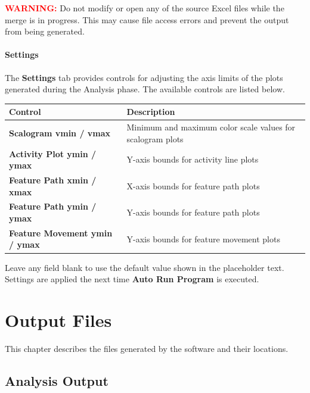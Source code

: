 \documentclass[12pt,a4paper,oneside]{report}
\begin{document}
\vspace{0.5cm}

\noindent
\textcolor{red}{\textbf{WARNING:}}
Do not modify or open any of the source Excel files while the merge is in progress. This may cause file access errors and prevent the output from being generated.

\subsubsection{Settings}
\label{sec:settings}

The \textbf{Settings} tab provides controls for adjusting the axis limits of the plots generated during the Analysis phase. The available controls are listed below.

\begin{table}[H]
    \centering
    \begin{tabular}{>{\bfseries}l l}
        \toprule
        Control & Description \\
        \midrule
        Scalogram vmin / vmax & Minimum and maximum color scale values for scalogram plots \\
        Activity Plot ymin / ymax & Y-axis bounds for activity line plots \\
        Feature Path xmin / xmax & X-axis bounds for feature path plots \\
        Feature Path ymin / ymax & Y-axis bounds for feature path plots \\
        Feature Movement ymin / ymax & Y-axis bounds for feature movement plots \\
        \bottomrule
    \end{tabular}
\end{table}

Leave any field blank to use the default value shown in the placeholder text. Settings are applied the next time \textbf{Auto Run Program} is executed.

\cleardoublepage

\chapter{Output Files}

This chapter describes the files generated by the software and their locations.

\section*{Analysis Output}
\end{document}
